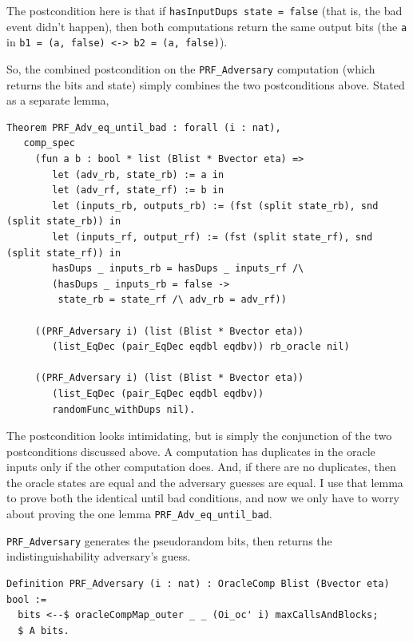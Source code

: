 \documentclass[12pt,lot, lof]{puthesis}
\newcommand{\li} {\lstinline}
\begin{document}
{The postcondition here is that if \li|hasInputDups state = false| (that is, the bad event didn't happen), then both computations return the same output bits (the \li|a| in \li|b1 = (a, false) <-> b2 = (a, false)|).

So, the combined postcondition on the \li|PRF_Adversary| computation (which returns the bits and state) simply combines the two postconditions above. Stated as a separate lemma,

\begin{lstlisting}
Theorem PRF_Adv_eq_until_bad : forall (i : nat),
   comp_spec 
     (fun a b : bool * list (Blist * Bvector eta) =>
        let (adv_rb, state_rb) := a in
        let (adv_rf, state_rf) := b in
        let (inputs_rb, outputs_rb) := (fst (split state_rb), snd (split state_rb)) in
        let (inputs_rf, output_rf) := (fst (split state_rf), snd (split state_rf)) in
        hasDups _ inputs_rb = hasDups _ inputs_rf /\
        (hasDups _ inputs_rb = false ->
         state_rb = state_rf /\ adv_rb = adv_rf))
         
     ((PRF_Adversary i) (list (Blist * Bvector eta))
        (list_EqDec (pair_EqDec eqdbl eqdbv)) rb_oracle nil)
        
     ((PRF_Adversary i) (list (Blist * Bvector eta))
        (list_EqDec (pair_EqDec eqdbl eqdbv))
        randomFunc_withDups nil).
\end{lstlisting}

The postcondition looks intimidating, but is simply the conjunction of the two postconditions discussed above. A computation has duplicates in the oracle inputs only if the other computation does. And, if there are no duplicates, then the oracle states are equal and the adversary guesses are equal. I use that lemma to prove both the identical until bad conditions, and now we only have to worry about proving the one lemma \li|PRF_Adv_eq_until_bad|.

\li|PRF_Adversary| generates the pseudorandom bits, then returns the indistinguishability adversary's guess. 

\begin{lstlisting}
Definition PRF_Adversary (i : nat) : OracleComp Blist (Bvector eta) bool :=
  bits <--$ oracleCompMap_outer _ _ (Oi_oc' i) maxCallsAndBlocks;
  $ A bits.
\end{lstlisting}

}
\end{document}

